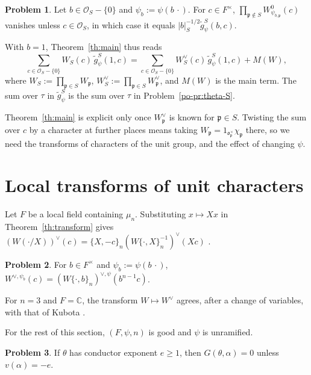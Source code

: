 \documentclass[reqno]{amsart}
\newcommand{\oo}{\mathfrak{o}}
\newcommand{\pp}{\mathfrak{p}}
\numberwithin{equation}{section}
\theoremstyle{definition}
\newtheorem{problem}{Problem}[section]
\theoremstyle{plain}
\begin{document}
\begin{problem}\label{pr:product-basic}
  Let $b \in \mathcal{O}_S - \{0\}$ and $\psi_b := \psi(b \, \cdot)$.  For $c \in F^\times$, $\prod_{\pp \notin S} W_{\psi_{b, \pp}}^0(c)$ vanishes unless $c \in \mathcal{O}_S$, in which case it equals $\lvert b \rvert_S^{-1/2} \tilde{g}_\psi^S(b, c)$.
\end{problem}

With $b = 1$, Theorem~\ref{th:main} thus reads
\begin{equation*}
  \sum_{c \in \mathcal{O}_S - \{0\}} W_S(c) \, \tilde{g}_\psi^S(1, c)
  = \sum_{c \in \mathcal{O}_S - \{0\}} W_S^\vee(c) \, \tilde{g}_\psi^S(1, c) + M(W),
\end{equation*}
where $W_S := \prod_{\pp \in S} W_\pp$, $W_S^\vee := \prod_{\pp \in S} W_\pp^\vee$, and $M(W)$ is the main term.  The sum over $\tau$ in $\tilde{g}_\psi^S$ is the sum over $\tau$ in Problem~\ref{po-pr:theta-S}.

Theorem~\ref{th:main} is explicit only once $W_\pp^\vee$ is known for $\pp \in S$.  Twisting the sum over $c$ by a character at further places means taking $W_\pp = 1_{\oo_\pp^\times} \chi_\pp$ there, so we need the transforms of characters of the unit group, and the effect of changing $\psi$.

\section{Local transforms of unit characters}\label{sec:local}

Let $F$ be a local field containing $\mu_n$.  Substituting $x \mapsto X x$ in Theorem~\ref{th:transform} gives $(W(\cdot / X))^\vee(c) = \{X, -c\}_n (W \{\cdot, X\}_n^{-1})^\vee(X c)$ \cite[Lemma~10.17]{N}.

\begin{problem}\label{pr:change-character}
  For $b \in F^\times$ and $\psi_b := \psi(b \, \cdot)$, $W^{\vee, \psi_b}(c) = (W \{\cdot, b\}_n)^{\vee, \psi}(b^{n-1} c)$.
\end{problem}

For $n = 3$ and $F = \mathbb{C}$, the transform $W \mapsto W^\vee$ agrees, after a change of variables, with that of Kubota \cite[(5)]{Kub74} \cite[Remark~10.21]{N}.

For the rest of this section, $(F, \psi, n)$ is good and $\psi$ is unramified.

\begin{problem}\label{pr:gauss-vanish}
  If $\theta$ has conductor exponent $e \geq 1$, then $G(\theta, \alpha) = 0$ unless $v(\alpha) = -e$.
\end{problem}
\end{document}
